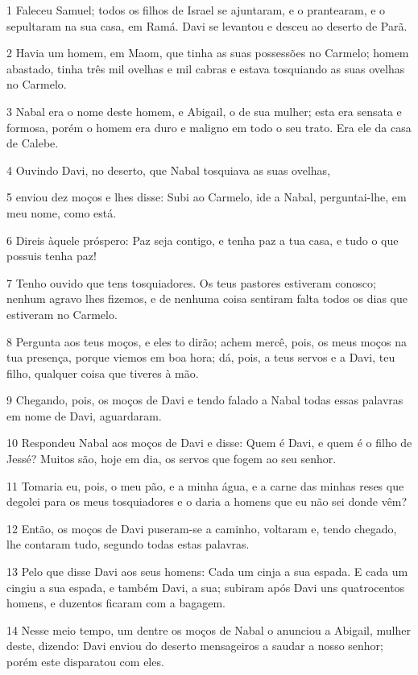 \par 1 Faleceu Samuel; todos os filhos de Israel se ajuntaram, e o prantearam, e o sepultaram na sua casa, em Ramá. Davi se levantou e desceu ao deserto de Parã.
\par 2 Havia um homem, em Maom, que tinha as suas possessões no Carmelo; homem abastado, tinha três mil ovelhas e mil cabras e estava tosquiando as suas ovelhas no Carmelo.
\par 3 Nabal era o nome deste homem, e Abigail, o de sua mulher; esta era sensata e formosa, porém o homem era duro e maligno em todo o seu trato. Era ele da casa de Calebe.
\par 4 Ouvindo Davi, no deserto, que Nabal tosquiava as suas ovelhas,
\par 5 enviou dez moços e lhes disse: Subi ao Carmelo, ide a Nabal, perguntai-lhe, em meu nome, como está.
\par 6 Direis àquele próspero: Paz seja contigo, e tenha paz a tua casa, e tudo o que possuis tenha paz!
\par 7 Tenho ouvido que tens tosquiadores. Os teus pastores estiveram conosco; nenhum agravo lhes fizemos, e de nenhuma coisa sentiram falta todos os dias que estiveram no Carmelo.
\par 8 Pergunta aos teus moços, e eles to dirão; achem mercê, pois, os meus moços na tua presença, porque viemos em boa hora; dá, pois, a teus servos e a Davi, teu filho, qualquer coisa que tiveres à mão.
\par 9 Chegando, pois, os moços de Davi e tendo falado a Nabal todas essas palavras em nome de Davi, aguardaram.
\par 10 Respondeu Nabal aos moços de Davi e disse: Quem é Davi, e quem é o filho de Jessé? Muitos são, hoje em dia, os servos que fogem ao seu senhor.
\par 11 Tomaria eu, pois, o meu pão, e a minha água, e a carne das minhas reses que degolei para os meus tosquiadores e o daria a homens que eu não sei donde vêm?
\par 12 Então, os moços de Davi puseram-se a caminho, voltaram e, tendo chegado, lhe contaram tudo, segundo todas estas palavras.
\par 13 Pelo que disse Davi aos seus homens: Cada um cinja a sua espada. E cada um cingiu a sua espada, e também Davi, a sua; subiram após Davi uns quatrocentos homens, e duzentos ficaram com a bagagem.
\par 14 Nesse meio tempo, um dentre os moços de Nabal o anunciou a Abigail, mulher deste, dizendo: Davi enviou do deserto mensageiros a saudar a nosso senhor; porém este disparatou com eles.
